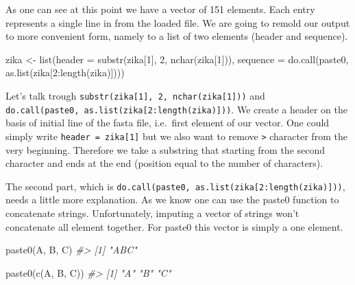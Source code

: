 \documentclass[
]{book}
\newenvironment{Shaded}{\begin{snugshade}}{\end{snugshade}}
\newcommand{\CommentTok}[1]{\textcolor[rgb]{0.56,0.35,0.01}{\textit{#1}}}
\newcommand{\DecValTok}[1]{\textcolor[rgb]{0.00,0.00,0.81}{#1}}
\newcommand{\FunctionTok}[1]{\textcolor[rgb]{0.00,0.00,0.00}{#1}}
\newcommand{\NormalTok}[1]{#1}
\newcommand{\OtherTok}[1]{\textcolor[rgb]{0.56,0.35,0.01}{#1}}
\newcommand{\SpecialCharTok}[1]{\textcolor[rgb]{0.00,0.00,0.00}{#1}}
\newcommand{\StringTok}[1]{\textcolor[rgb]{0.31,0.60,0.02}{#1}}
\begin{document}
As one can see at this point we have a vector of 151 elements. Each entry represents a single line in from the loaded file. We are going to remold our output to more convenient form, namely to a list of two elements (header and sequence).

\begin{Shaded}
\begin{Highlighting}[]
\NormalTok{zika }\OtherTok{\textless{}{-}} \FunctionTok{list}\NormalTok{(}\StringTok{\textquotesingle{}header\textquotesingle{}} \OtherTok{=} \FunctionTok{substr}\NormalTok{(zika[}\DecValTok{1}\NormalTok{], }\DecValTok{2}\NormalTok{, }\FunctionTok{nchar}\NormalTok{(zika[}\DecValTok{1}\NormalTok{])), }
             \StringTok{\textquotesingle{}sequence\textquotesingle{}} \OtherTok{=} \FunctionTok{do.call}\NormalTok{(paste0, }\FunctionTok{as.list}\NormalTok{(zika[}\DecValTok{2}\SpecialCharTok{:}\FunctionTok{length}\NormalTok{(zika)])))}
\end{Highlighting}
\end{Shaded}

Let's talk trough \texttt{substr(zika{[}1{]},\ 2,\ nchar(zika{[}1{]}))} and \texttt{do.call(paste0,\ as.list(zika{[}2:length(zika){]}))}. We create a header on the basis of initial line of the fasta file, i.e.~first element of our vector. One could simply write \texttt{\textquotesingle{}header\textquotesingle{}\ =\ zika{[}1{]}} but we also want to remove \texttt{\textgreater{}} character from the very beginning. Therefore we take a substring that starting from the second character and ends at the end (position equal to the number of characters).

The second part, which is \texttt{do.call(paste0,\ as.list(zika{[}2:length(zika){]}))}, needs a little more explanation. As we know one can use the paste0 function to concatenate strings. Unfortunately, imputing a vector of strings won't concatenate all element together. For paste0 this vector is simply a one element.

\begin{Shaded}
\begin{Highlighting}[]
\FunctionTok{paste0}\NormalTok{(}\StringTok{\textquotesingle{}A\textquotesingle{}}\NormalTok{, }\StringTok{\textquotesingle{}B\textquotesingle{}}\NormalTok{, }\StringTok{\textquotesingle{}C\textquotesingle{}}\NormalTok{)}
\CommentTok{\#\textgreater{} [1] "ABC"}

\FunctionTok{paste0}\NormalTok{(}\FunctionTok{c}\NormalTok{(}\StringTok{\textquotesingle{}A\textquotesingle{}}\NormalTok{, }\StringTok{\textquotesingle{}B\textquotesingle{}}\NormalTok{, }\StringTok{\textquotesingle{}C\textquotesingle{}}\NormalTok{))}
\CommentTok{\#\textgreater{} [1] "A" "B" "C"}
\end{Highlighting}
\end{Shaded}
\end{document}
